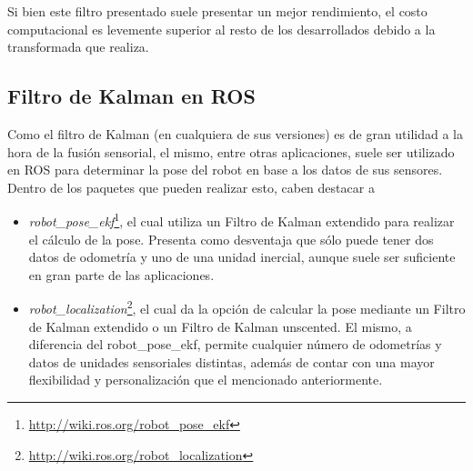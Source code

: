Si bien este filtro presentado suele presentar un mejor rendimiento, el costo computacional es levemente superior al resto de los desarrollados debido a la transformada que realiza.

\subsection{Filtro de Kalman en ROS}
Como el filtro de Kalman (en cualquiera de sus versiones) es de gran utilidad a la hora de la fusión sensorial, el mismo, entre otras aplicaciones, suele ser utilizado en ROS para determinar la pose del robot en base a los datos de sus sensores. Dentro de los paquetes que pueden realizar esto, caben destacar a
\begin{itemize}
    \item \textit{robot\_pose\_ekf}\footnote{\url{http://wiki.ros.org/robot_pose_ekf}}, el cual utiliza un Filtro de Kalman extendido para realizar el cálculo de la pose. Presenta como desventaja que sólo puede tener dos datos de odometría y uno de una unidad inercial, aunque suele ser suficiente en gran parte de las aplicaciones.
    \item \textit{robot\_localization}\footnote{\url{http://wiki.ros.org/robot_localization}}, el cual da la opción de calcular la pose mediante un Filtro de Kalman extendido o un Filtro de Kalman unscented. El mismo, a diferencia del robot\_pose\_ekf, permite cualquier número de odometrías y datos de unidades sensoriales distintas, además de contar con una mayor flexibilidad y personalización que el mencionado anteriormente.
\end{itemize}



